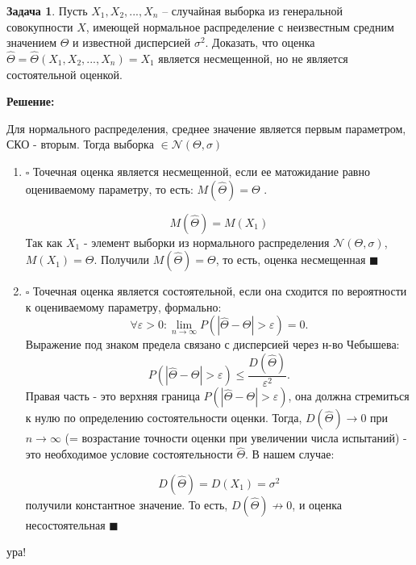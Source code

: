 \documentclass[a4paper,12pt]{article}
\theoremstyle{definition}
\newtheorem{problem}{Задача}\setlength{\parindent}{0pt}
\newenvironment{solution}
{\begin{shaded}\textbf{Решение:}\par\setlength{\parindent}{0pt}}
{\end{shaded}}
\newenvironment{answer}
{\par\noindent\textbf{Ответ:}}
{\par}
\begin{document}
\vspace{8pt}
\begin{problem}
    Пусть \(X_1,X_2, ... ,X_n\) – случайная выборка из генеральной совокупности \(X\), 
    имеющей нормальное распределение с неизвестным средним значением \( \Theta \) 
    и известной дисперсией \( \sigma ^ 2\). Доказать, что оценка 
    \( \hat\Theta = \hat\Theta (X_1,X_2, ... ,X_n) = X_1 \) является несмещенной, 
    но не является состоятельной оценкой.

    \begin{solution}
        Для нормального распределения, среднее значение является первым параметром, СКО - вторым. 
        Тогда выборка \(\in \mathcal{N}(\Theta, \sigma)\)
        \begin{enumerate}
            \item \(\square\) Точечная оценка является несмещенной, если ее матожидание 
                  равно оцениваемому параметру, то есть: \(M(\hat{\Theta}) = \Theta\) .

                  \[ M(\hat{\Theta}) = M(X_1)\]
                  Так как \(X_1\) - элемент выборки из нормального распределения \(\mathcal{N}(\Theta, \sigma)\),
                  \(M(X_1) = \Theta\). Получили \(M(\hat{\Theta}) = \Theta\), то есть, оценка несмещенная \(\blacksquare\)

            \item \(\square\) Точечная оценка является состоятельной, если она сходится по вероятности 
                  к оцениваемому параметру, формально:
                  \[\forall\varepsilon > 0 : \lim_{n\to\infty}P(|\hat{\Theta} - \Theta| > \varepsilon) = 0.\]
                  Выражение под знаком предела связано с дисперсией через н-во Чебышева: 
                  \[ P(|\hat{\Theta} - \Theta| > \varepsilon) \leq \frac{D(\hat{\Theta})}{\varepsilon^2}.\]
                  Правая часть - это верхняя граница \( P(|\hat{\Theta} - \Theta| > \varepsilon) \), она должна стремиться 
                  к нулю по определению состоятельности оценки. 
                  Тогда, \(D(\hat{\Theta})\to0\) при \(n\to\infty\) (= возрастание точности оценки при увеличении числа испытаний) 
                  - это необходимое условие состоятельности \(\hat{\Theta}\). В нашем случае:

                  \[D(\hat{\Theta}) = D(X_1) = \sigma^2\]
                  получили константное значение. То есть, \(D(\hat{\Theta}) \nrightarrow 0\), и оценка несостоятельная \(\blacksquare\)

        \end{enumerate}
    \end{solution}


\end{problem}

\vspace{25pt}
ура!
\end{document}
